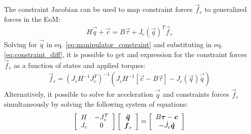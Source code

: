 The constraint Jacobian can be used to map constraint forces $\vec{f}_c$ to generalized forces in the EoM:
%
\begin{align}
H \vec{\ddot{q}} + \vec{c} = B \vec{\tau} + J_c( \vec{ q } )^T  \vec{f}_c
\label{eq:manipulator_constraint}
\end{align}
%
Solving for $\vec{\ddot{q}}$ in eq. \eqref{eq:manipulator_constraint} and substituting in eq. \eqref{eq:constraint_diff}, it is possible to get and expression for the constraint forces $\vec{f}_c$ as a function of states and applied torques:
%
\begin{align}
\vec{f}_c = \left( J_c H^{-1} J_c^T \right)^{-1} \left(  J_c H^{-1} [\vec{c} - B \vec{\tau} ] - \dot{J}_c( \vec{ q } ) \vec{\dot{q}}   \right)
\label{eq:const_forces}
\end{align}
%
Alternatively, it possible to solve for acceleration $\vec{\ddot{q}}$ and constraints forces $\vec{f}_c$ simultaneously by solving the following system of equations:
%
\begin{align}
\left[ \begin{array}{c c } 	H & -J_c^T  \\ J_c 	& 0  	\end{array} \right] \left[ \begin{array}{c} \vec{\ddot{q}}  \\ \vec{f}_c \end{array} \right] = \left[ \begin{array}{c}  B \vec{\tau} - \vec{c}   \\ -\dot{J}_c \vec{\dot{q}}  \end{array} \right]
\label{eq:manipulator_constraint_eom}
\end{align}


